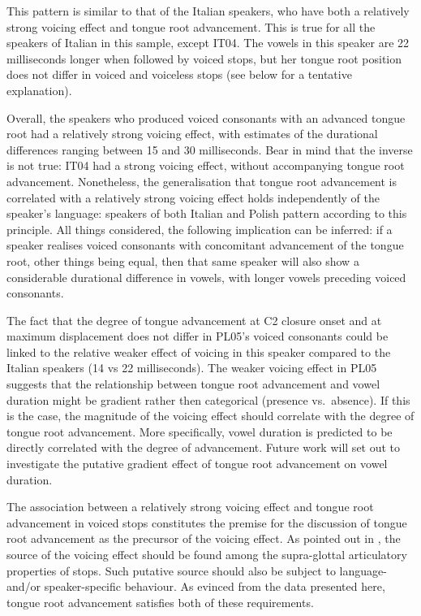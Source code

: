 \documentclass[authoryear, twocolumn]{elsarticle}
\begin{document}
This pattern is similar to that of the Italian speakers, who have both a
relatively strong voicing effect and tongue root advancement. This is
true for all the speakers of Italian in this sample, except IT04. The
vowels in this speaker are 22 milliseconds longer when followed by
voiced stops, but her tongue root position does not differ in voiced and
voiceless stops (see below for a tentative explanation).

Overall, the speakers who produced voiced consonants with an advanced
tongue root had a relatively strong voicing effect, with estimates of
the durational differences ranging between 15 and 30 milliseconds. Bear
in mind that the inverse is not true: IT04 had a strong voicing effect,
without accompanying tongue root advancement. Nonetheless, the
generalisation that tongue root advancement is correlated with a
relatively strong voicing effect holds independently of the speaker's
language: speakers of both Italian and Polish pattern according to this
principle. All things considered, the following implication can be
inferred: if a speaker realises voiced consonants with concomitant
advancement of the tongue root, other things being equal, then that same
speaker will also show a considerable durational difference in vowels,
with longer vowels preceding voiced consonants.

The fact that the degree of tongue advancement at C2 closure onset and
at maximum displacement does not differ in PL05's voiced consonants
could be linked to the relative weaker effect of voicing in this speaker
compared to the Italian speakers (14 vs 22 milliseconds). The weaker
voicing effect in PL05 suggests that the relationship between tongue
root advancement and vowel duration might be gradient rather then
categorical (presence vs.~absence). If this is the case, the magnitude
of the voicing effect should correlate with the degree of tongue root
advancement. More specifically, vowel duration is predicted to be
directly correlated with the degree of advancement. Future work will set
out to investigate the putative gradient effect of tongue root
advancement on vowel duration.

The association between a relatively strong voicing effect and tongue
root advancement in voiced stops constitutes the premise for the
discussion of tongue root advancement as the precursor of the voicing
effect. As pointed out in , the source of the voicing
effect should be found among the supra-glottal articulatory properties
of stops. Such putative source should also be subject to language-
and/or speaker-specific behaviour. As evinced from the data presented
here, tongue root advancement satisfies both of these requirements.
\end{document}
